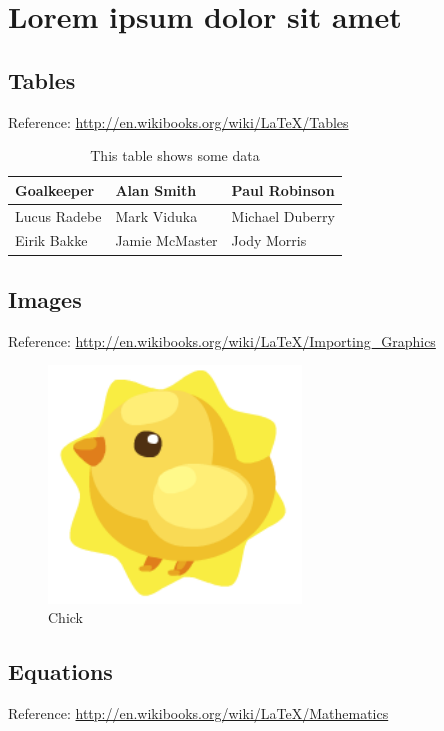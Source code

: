 \chapter{Lorem ipsum dolor sit amet}\label{chp:LABEL_CHP_3}

\section{Tables}\label{sec:LABEL_CHP_3_SEC_A}
Reference: \url{http://en.wikibooks.org/wiki/LaTeX/Tables}

\begin{table}[!h]
  \centering
  \begin{tabular}{ |l|l|l| }
    \hline
      Goalkeeper & Alan Smith & Paul Robinson \\
    \hline
      Lucus Radebe &  Mark Viduka & Michael Duberry \\
    \hline
      Eirik Bakke & Jamie McMaster & Jody Morris \\
    \hline
  \end{tabular}
  \caption{This table shows some data}
  \label{tab:LABEL_TAB_1}
\end{table}

\section{Images}\label{sec:LABEL_CHP_3_SEC_B}
Reference: \url{http://en.wikibooks.org/wiki/LaTeX/Importing_Graphics}

\begin{figure}
  \centering
  \includegraphics[width=0.6\textwidth]{imagens/chick.png}
  \caption{Chick}
  \label{fig:LABEL_FIG_1}
\end{figure}

\section{Equations}\label{sec:LABEL_CHP_3_SEC_C}
Reference: \url{http://en.wikibooks.org/wiki/LaTeX/Mathematics}

